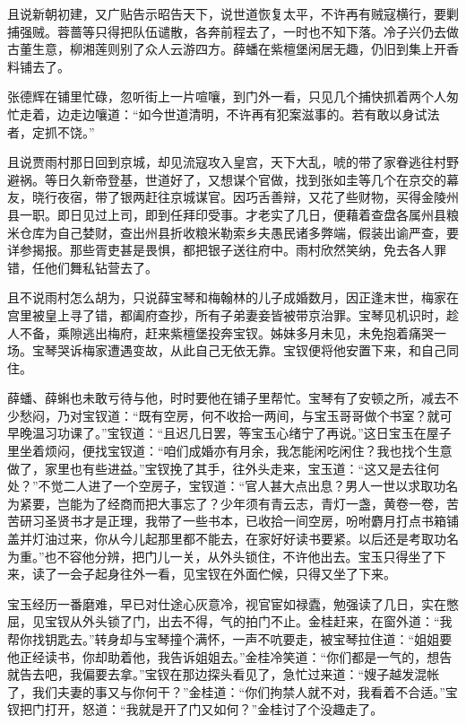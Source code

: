 \documentclass[12pt,oneside]{book}
\begin{document}
且说新朝初建，又广贴告示昭告天下，说世道恢复太平，不许再有贼寇横行，要剿捕强贼。蓉蔷等只得把队伍谴散，各奔前程去了，一时也不知下落。冷子兴仍去做古董生意，柳湘莲则别了众人云游四方。薛蟠在紫檀堡闲居无趣，仍旧到集上开香料铺去了。

张德辉在铺里忙碌，忽听街上一片喧嚷，到门外一看，只见几个捕快抓着两个人匆忙走着，边走边嚷道：“如今世道清明，不许再有犯案滋事的。若有敢以身试法者，定抓不饶。”

且说贾雨村那日回到京城，却见流寇攻入皇宫，天下大乱，唬的带了家眷逃往村野避祸。等日久新帝登基，世道好了，又想谋个官做，找到张如圭等几个在京交的幕友，晓行夜宿，带了银两赶往京城谋官。因巧舌善辩，又花了些财物，买得金陵州县一职。即日见过上司，即到任拜印受事。才老实了几日，便藉着查盘各属州县粮米仓库为自己婪财，查出州县折收粮米勒索乡夫愚民诸多弊端，假装出谕严查，要详参揭报。那些胥吏甚是畏惧，都把银子送往府中。雨村欣然笑纳，免去各人罪错，任他们舞私钻营去了。

且不说雨村怎么胡为，只说薛宝琴和梅翰林的儿子成婚数月，因正逢末世，梅家在宫里被皇上寻了错，都阖府查抄，所有子弟妻妾皆被带京治罪。宝琴见机识时，趁人不备，乘隙逃出梅府，赶来紫檀堡投奔宝钗。姊妹多月未见，未免抱着痛哭一场。宝琴哭诉梅家遭遇变故，从此自己无依无靠。宝钗便将他安置下来，和自己同住。

薛蟠、薛蝌也未敢亏待与他，时时要他在铺子里帮忙。宝琴有了安顿之所，减去不少愁闷，乃对宝钗道：“既有空房，何不收拾一两间，与宝玉哥哥做个书室？就可早晚温习功课了。”宝钗道：“且迟几日罢，等宝玉心绪宁了再说。”这日宝玉在屋子里坐着烦闷，便找宝钗道：“咱们成婚亦有月余，我怎能闲吃闲住？我也找个生意做了，家里也有些进益。”宝钗挽了其手，往外头走来，宝玉道：“这又是去往何处？”不觉二人进了一个空房子，宝钗道：“官人甚大点出息？男人一世以求取功名为紧要，岂能为了经商而把大事忘了？少年须有青云志，青灯一盏，黄卷一卷，苦苦研习圣贤书才是正理，我带了一些书本，已收拾一间空房，吩咐麝月打点书箱铺盖并灯油过来，你从今儿起那里都不能去，在家好好读书要紧。以后还是考取功名为重。”也不容他分辨，把门儿一关，从外头锁住，不许他出去。宝玉只得坐了下来，读了一会子起身往外一看，见宝钗在外面伫候，只得又坐了下来。

宝玉经历一番磨难，早已对仕途心灰意冷，视官宦如禄蠹，勉强读了几日，实在憋屈，见宝钗从外头锁了门，出去不得，气的拍门不止。金桂赶来，在窗外道：“我帮你找钥匙去。”转身却与宝琴撞个满怀，一声不吭要走，被宝琴拉住道：“姐姐要他正经读书，你却助着他，我告诉姐姐去。”金桂冷笑道：“你们都是一气的，想告就告去吧，我偏要去拿。”宝钗在那边探头看见了，急忙过来道：“嫂子越发混帐了，我们夫妻的事又与你何干？”金桂道：“你们拘禁人就不对，我看着不合适。”宝钗把门打开，怒道：“我就是开了门又如何？”金桂讨了个没趣走了。
\end{document}
